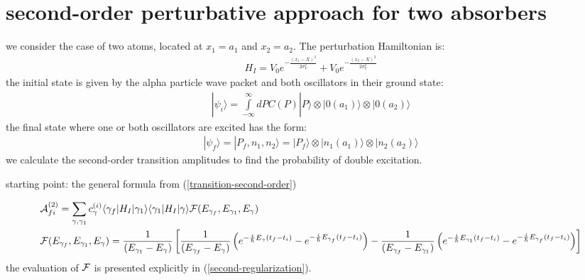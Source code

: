 \newpage
\section{second-order perturbative approach for two absorbers}

we consider the case of two atoms, located at $x_1=a_1$ and $x_2=a_2$. The perturbation Hamiltonian is:
\begin{align}
  H_I = V_0 e^{-\frac{(x_1-X)^2}{2\sigma_V^2}} + V_0 e^{-\frac{(x_2-X)^2}{2\sigma_V^2}}
\end{align}
the initial state is given by the alpha particle wave packet and both oscillators in their ground state:
\begin{align}
  |\psi_i\rangle = \int\limits_{-\infty}^{\infty}dP C(P)|P\rangle\otimes|0(a_1)\rangle\otimes|0(a_2)\rangle
\end{align}
the final state where one or both oscillators are excited has the form:
\begin{align}
  |\psi_f\rangle = |P_f, n_1, n_2\rangle = |P_f\rangle\otimes|n_1(a_1)\rangle\otimes|n_2(a_2)\rangle
\end{align}
we calculate the  second-order transition amplitudes to find the probability of double excitation.

starting point: the general formula from (\ref{transition-second-order})

\begin{align}
  &{\cal A}_{fi}^{(2)} =  \sum_{\gamma, \gamma_1} c_{\gamma}^{(i)}\langle\gamma_f|H_I|\gamma_1\rangle \langle\gamma_1|H_I|\gamma\rangle{\cal F}(E_{\gamma_f}, E_{\gamma_1},E_\gamma)\\
  &{\cal F}(E_{\gamma_f}, E_{\gamma_1},E_\gamma)= \frac{1}{(E_{\gamma_1}-E_{\gamma})} \left[ \frac{1}{(E_{\gamma_f}-E_{\gamma})}\left(e^{-\frac{i}{\hbar}E_{\gamma}(t_f-t_i)}-e^{-\frac{i}{\hbar}E_{\gamma_f}(t_f-t_i)}\right)-\frac{1}{(E_{\gamma_f}-E_{\gamma_1})}\left(e^{-\frac{i}{\hbar}E_{\gamma_1}(t_f-t_i)}-e^{-\frac{i}{\hbar}E_{\gamma_f}(t_f-t_i)}\right) \right]
\end{align}\label{a2sumgen}
the evaluation of ${\cal F}$ is presented explicitly in (\ref{second-regularization}).


